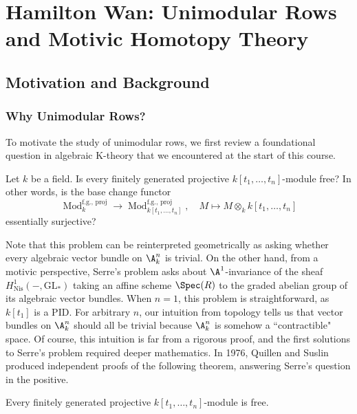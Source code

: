 \section{Hamilton Wan: Unimodular Rows and Motivic Homotopy Theory}

\subsection{Motivation and Background}

\subsubsection{Why Unimodular Rows?} 

To motivate the study of unimodular rows, we first review a foundational question in algebraic K-theory that we encountered at the start of this course. 

\begin{question}
    Let $k$ be a field. Is every finitely generated projective $k[t_1,\ldots,t_n]$-module free? In other words, is the base change functor \[\operatorname{Mod}_k^{\text{f.g., proj}} \to \operatorname{Mod}_{k[t_1,\ldots,t_n]}^{\text{f.g., proj}}, \quad M \mapsto M \otimes_k k[t_1,\ldots,t_n]\] essentially surjective?
\end{question}

Note that this problem can be reinterpreted geometrically as asking whether every algebraic vector bundle on $\A^n_k$ is trivial. On the other hand, from a motivic perspective, Serre's problem asks about $\A^1$-invariance of the sheaf $H^1_{\mathrm{Nis}}(-,\mathrm{GL}_*)$ taking an affine scheme $\Spec(R)$ to the graded abelian group of its algebraic vector bundles. When $n = 1$, this problem is straightforward, as $k[t_1]$ is a PID. For arbitrary $n$, our intuition from topology tells us that vector bundles on $\A^n_k$ should all be trivial because $\A^n_k$ is somehow a ``contractible" space. Of course, this intuition is far from a rigorous proof, and the first solutions to Serre's problem required deeper mathematics. In 1976, Quillen \cite{quillen_serre_problem} and Suslin \cite{suslin_serre_conj} produced independent proofs of the following theorem, answering Serre's question in the positive.

\begin{theorem}
    Every finitely generated projective $k[t_1,\ldots,t_n]$-module is free.
\end{theorem}

